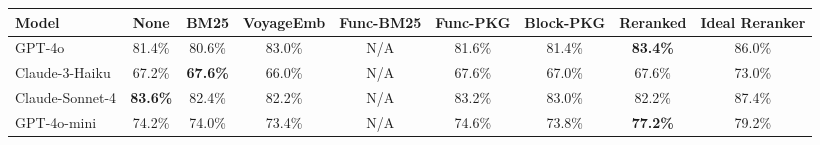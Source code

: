 \begin{tabular}{lcccccccc}
\toprule
\textbf{Model} & \textbf{None} & \textbf{BM25} & \textbf{VoyageEmb} & \textbf{Func-BM25}  & \textbf{Func-PKG} & \textbf{Block-PKG} & \textbf{Reranked} & \textbf{Ideal Reranker} \\
\midrule
GPT-4o & 81.4\% \cellcolor{gray!0} & \cellcolor{OrangeRed!12}80.6\% & \cellcolor{ForestGreen!24}83.0\% & N/A & \cellcolor{ForestGreen!3}81.6\% & 81.4\% & \cellcolor{ForestGreen!30}\textbf{83.4\%} & \cellcolor{BlueViolet!20}86.0\% \\
Claude-3-Haiku & 67.2\% \cellcolor{gray!0} & \cellcolor{ForestGreen!6}\textbf{67.6\%} & \cellcolor{OrangeRed!18}66.0\% & N/A & \cellcolor{ForestGreen!6}67.6\% & \cellcolor{OrangeRed!3}67.0\% & \cellcolor{ForestGreen!6}67.6\% & \cellcolor{BlueViolet!20}73.0\% \\
Claude-Sonnet-4 & \cellcolor{gray!0}\textbf{83.6\%} & \cellcolor{OrangeRed!18}82.4\% & \cellcolor{OrangeRed!21}82.2\% & N/A & \cellcolor{OrangeRed!6}83.2\% & \cellcolor{OrangeRed!9}83.0\% & \cellcolor{OrangeRed!21}82.2\% & \cellcolor{BlueViolet!20}87.4\% \\
GPT-4o-mini & 74.2\% \cellcolor{gray!0} & \cellcolor{OrangeRed!3}74.0\% & \cellcolor{OrangeRed!12}73.4\% & N/A & \cellcolor{ForestGreen!6}74.6\% & \cellcolor{OrangeRed!6}73.8\% & \cellcolor{ForestGreen!45}\textbf{77.2\%} & \cellcolor{BlueViolet!20}79.2\% \\
\bottomrule
\end{tabular}